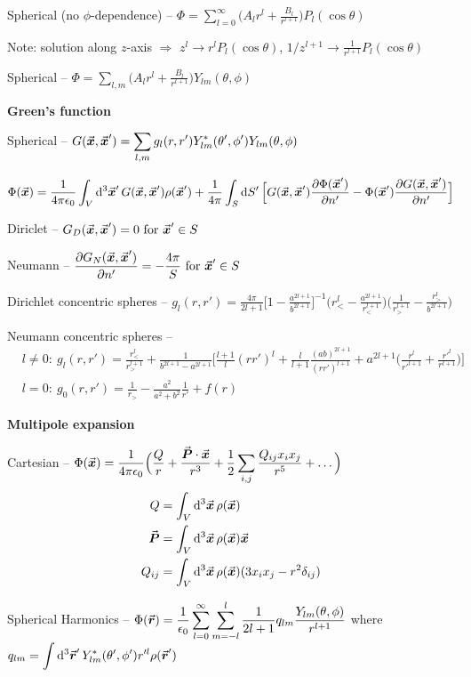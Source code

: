 Spherical (no $\phi$-dependence) -- $\displaystyle \Phi = \sum_{l=0}^{\infty} \Big( A_{l} r^{l} + \frac{B_{l}}{r^{l+1}} \Big) P_{l}(\cos{\theta}) $

Note: solution along $z$-axis $\Rightarrow$ $z^{l} \rightarrow r^{l} P_{l}(\cos{\theta})$, $\displaystyle 1/z^{l+1} \rightarrow \frac{1}{r^{l+1}}P_{l}(\cos{\theta})$

Spherical -- $\displaystyle \Phi = \sum_{l,m} \Big( A_{l} r^{l} + \frac{B_{l}}{r^{l+1}} \Big) Y_{lm}(\theta,\phi)$

\textbf{Green's function}

Spherical -- $\displaystyle G(\va*{x},\va*{x}') = \sum_{l,m} g_{l}(r,r') Y_{lm}^{*}(\theta',\phi') Y_{lm}(\theta,\phi)$


$\displaystyle \Phi(\va*{x}) = \frac{1}{4 \pi \epsilon_0} \int_{V} \dd[3]{\va*{x}'} G(\va*{x},\va*{x}') \rho(\va*{x}') + \frac{1}{4\pi} \int_{S} \dd{S'} \Big[ G(\va*{x},\va*{x}') \pdv{\Phi(\va*{x}')}{n'} - \Phi(\va*{x}') \pdv{G(\va*{x},\va*{x}')}{n'} \Big]$

Diriclet -- $G_{D}(\va*{x},\va*{x}') = 0~{\rm for}~\va*{x}' \in S$

Neumann -- $\displaystyle \pdv{G_{N}(\va*{x},\va*{x}')}{n'} = -\frac{4 \pi}{S}~{\rm for}~\va*{x}' \in S$

Dirichlet concentric spheres -- $\displaystyle g_{l}(r,r') = \frac{4 \pi}{2l+1} \Big[ 1 - \frac{a^{2l+1}}{b^{2l+1}} \Big]^{-1} \Big( r_{<}^{l} - \frac{a^{2l+1}}{r_{<}^{l+1}} \Big) \Big( \frac{1}{r_{>}^{l+1}} - \frac{r_{>}^{l}}{b^{2l+1}} \Big)$

Neumann concentric spheres -- 
\begin{align}
    &l \ne 0:~ g_{l}(r,r') = \frac{r_{<}^{l}}{r_{>}^{l+1}} + \frac{1}{b^{2l+1} - a^{2l+1}} \Big[ \frac{l+1}{l} (r r')^{l} + \frac{l}{l+1} \frac{(a b)^{2l+1}}{(r r')^{l+1}} + a^{2l+1} \Big( \frac{r^{l}}{r'^{l+1}} + \frac{r'^{l}}{r^{l+1}} \Big) \Big] \\
    &l = 0:~g_{0}(r,r') = \frac{1}{r_{>}} - \frac{a^2}{a^2 + b^2} \frac{1}{r'} + f(r)
\end{align}

\textbf{Multipole expansion}

Cartesian -- $\displaystyle \Phi(\va*{x}) = \frac{1}{4 \pi \epsilon_0} \Big( \frac{Q}{r} + \frac{\va*{P} \cdot \va*{x}}{r^3} + \frac{1}{2} \sum_{i,j} \frac{Q_{ij} x_{i}x_{j}}{r^{5}} + \ldots \Big)$
\begin{align}
    Q &= \int_{V} \dd[3]{\va*{x}} \rho(\va*{x}) \\
    \va*{P} &= \int_{V} \dd[3]{\va*{x}} \rho(\va*{x}) \va*{x} \\
    Q_{ij} &= \int_{V} \dd[3]{\va*{x}} \rho(\va*{x})( 3x_{i}x_{j} - r^2 \delta_{ij} )
\end{align}

Spherical Harmonics -- $\displaystyle \Phi(\va*{r}) = \frac{1}{\epsilon_0} \sum_{l=0}^{\infty} \sum_{m=-l}^{l} \frac{1}{2l+1} q_{lm} \frac{Y_{lm}(\theta,\phi)}{r^{l+1}}$ where $\displaystyle q_{lm} = \int \dd[3]{\va*{r}'} Y_{lm}^{*}(\theta',\phi') r'^{l} \rho(\va*{r}')$




